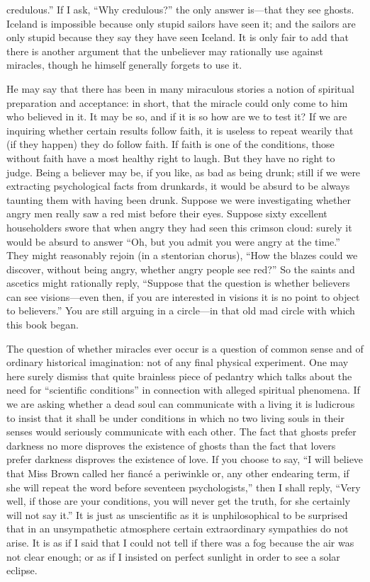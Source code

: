 credulous.” If I ask, “Why credulous?” the only answer is—that they see ghosts. Iceland is impossible because only stupid sailors have seen it; and the sailors are only stupid because they say they have seen Iceland. It is only fair to add that there is another argument that the unbeliever may rationally use against miracles, though he himself generally forgets to use it.

He may say that there has been in many miraculous stories a notion of spiritual preparation and acceptance: in short, that the miracle could only come to him who believed in it. It may be so, and if it is so how are we to test it? If we are inquiring whether certain results follow faith, it is useless to repeat wearily that (if they happen) they do follow faith. If faith is one of the conditions, those without faith have a most healthy right to laugh. But they have no right to judge. Being a believer may be, if you like, as bad as being drunk; still if we were extracting psychological facts from drunkards, it would be absurd to be always taunting them with having been drunk. Suppose we were investigating whether angry men really saw a red mist before their eyes. Suppose sixty excellent householders swore that when angry they had seen this crimson cloud: surely it would be absurd to answer “Oh, but you admit you were angry at the time.” They might reasonably rejoin (in a stentorian chorus), “How the blazes could we discover, without being angry, whether angry people see red?” So the saints and ascetics might rationally reply, “Suppose that the question is whether believers can see visions—even then, if you are interested in visions it is no point to object to believers.” You are still arguing in a circle—in that old mad circle with which this book began.

The question of whether miracles ever occur is a question of common sense and of ordinary historical imagination: not of any final physical experiment. One may here surely dismiss that quite brainless piece of pedantry which talks about the need for “scientific conditions” in connection with alleged spiritual phenomena. If we are asking whether a dead soul can communicate with a living it is ludicrous to insist that it shall be under conditions in which no two living souls in their senses would seriously communicate with each other. The fact that ghosts prefer darkness no more disproves the existence of ghosts than the fact that lovers prefer darkness disproves the existence of love. If you choose to say, “I will believe that Miss Brown called her fiancé a periwinkle or, any other endearing term, if she will repeat the word before seventeen psychologists,” then I shall reply, “Very well, if those are your conditions, you will never get the truth, for she certainly will not say it.” It is just as unscientific as it is unphilosophical to be surprised that in an unsympathetic atmosphere certain extraordinary sympathies do not arise. It is as if I said that I could not tell if there was a fog because the air was not clear enough; or as if I insisted on perfect sunlight in order to see a solar eclipse.

